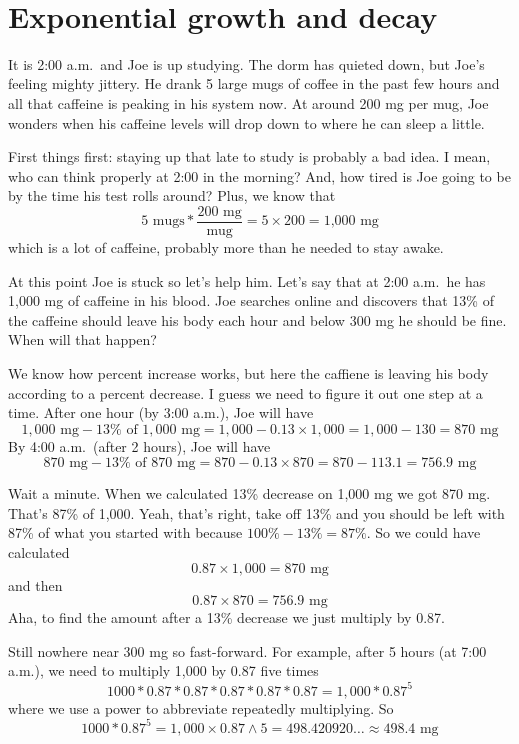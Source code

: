  ~\vspace{0.1in}
 
 \section{Exponential growth and decay}

It is 2:00 a.m.\ and Joe is up studying.  The dorm has quieted down, but Joe's feeling mighty jittery.  He  drank 5 large mugs of coffee in the past few hours and all that caffeine is peaking in his system now.  At around 200 mg per mug, Joe wonders when his caffeine levels will drop down to where he can sleep a little.  

First things first:  staying up that late to study is probably a bad idea.  I mean, who can think properly at 2:00 in the morning?  And, how tired is Joe going to be by the time his test rolls around?  Plus, we know that
$$5 \text{ mugs} \ast \frac{200 \text{ mg}}{\text{mug}} = 5 \times 200 = \text{1,000 mg}$$
which is a lot of caffeine, probably more than he needed to stay awake.  

At this point Joe is stuck so let's help him. Let's say that at 2:00 a.m.\ he has 1,000 mg of caffeine in his blood.  Joe searches online and discovers that 13\% of the caffeine should leave his body each hour and below 300 mg he should be fine.  When will that happen?

We know how percent increase works, but here the caffiene is leaving his body according to a percent decrease.  I guess we need to figure it out one step at a time.  After one hour (by 3:00 a.m.), Joe will have 
$$  1,000 \text{ mg} - 13 \% \text{ of }  1,000 \text{ mg} =  1,000- 0.13 \times  1,000 =  1,000 - 130 = 870 \text{ mg}$$
By 4:00 a.m.\ (after 2 hours), Joe will have
$$ 870 \text{ mg} - 13 \% \text{ of } 870 \text{ mg} = 870 - 0.13 \times 870 = 870 - 113.1 =  756.9 \text{ mg}$$

Wait a minute.  When we calculated 13\% decrease on  1,000 mg we got 870 mg.  That's 87\% of 1,000.  Yeah, that's right, take off 13\% and you should be left with 87\% of what you started with because $100\% - 13\% = 87\%$.
So we could have calculated 
$$ 0.87 \times 1,000 = 870 \text{ mg}$$
and then $$0.87 \times 870 = 756.9 \text{ mg}$$
Aha, to find the amount after a 13\% decrease we just multiply by 0.87.

Still nowhere near 300 mg so fast-forward.  For example, after 5 hours (at 7:00 a.m.), we need to multiply  1,000 by 0.87 five times
$$1000 \ast 0.87 \ast 0.87 \ast 0.87 \ast 0.87 \ast 0.87=  1,000 \ast 0.87^5$$
where we use a power to abbreviate repeatedly multiplying.  So
$$1000 \ast 0.87^5 =  1,000 \times 0.87 \wedge 5 = 498.420920\ldots \approx 498.4 \text{ mg}$$

